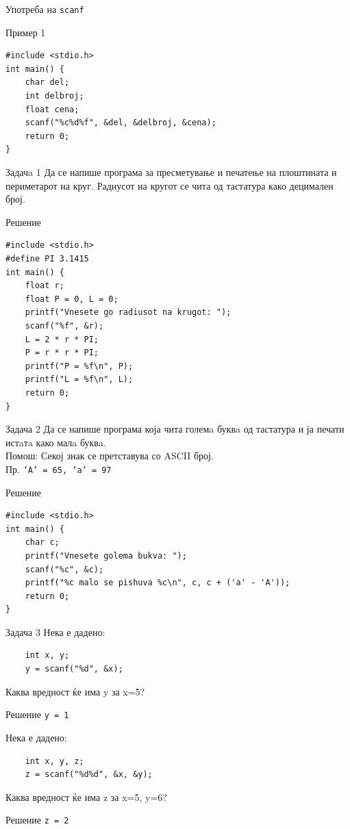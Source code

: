 \begin{frame}[fragile]{Употреба на \texttt{scanf}}

\begin{exampleblock}{Пример 1}
\begin{lstlisting}
#include <stdio.h>
int main() {
    char del;
    int delbroj;
    float cena;
    scanf("%c%d%f", &del, &delbroj, &cena);
    return 0;
}
\end{lstlisting}
\end{exampleblock}
\end{frame}

\begin{frame}[fragile]{Задачa 1}
Да се напише програма за пресметување и печатење на плоштината и периметарот на круг. 
Радиусот на кругот се чита од тастатура како децимален број.
\pause
\begin{exampleblock}{Решение}
\begin{lstlisting}
#include <stdio.h>
#define PI 3.1415
int main() {
    float r;
    float P = 0, L = 0;
    printf("Vnesete go radiusot na krugot: ");
    scanf("%f", &r);
    L = 2 * r * PI;
    P = r * r * PI;
    printf("P = %f\n", P);
    printf("L = %f\n", L);
    return 0;
}
\end{lstlisting}
\end{exampleblock}
\end{frame}

\begin{frame}[fragile]{Задача 2}
Да се напише програма која чита големa буквa од тастатура и ја печати истaтa како малa буквa.\\
Помош: Секој знак се претставува со ASCII број.\\
Пр. \texttt{'А' = 65, 'а' = 97}
\pause
\begin{exampleblock}{Решение}
\begin{lstlisting}
#include <stdio.h>
int main() {
    char c;
    printf("Vnesete golema bukva: ");
    scanf("%c", &c);
    printf("%c malo se pishuva %c\n", c, c + ('a' - 'A'));
    return 0;
}
\end{lstlisting}
\end{exampleblock}
\end{frame}

\begin{frame}[fragile]{Задача 3}
Нека е дадено:
\begin{lstlisting}
    int x, y;
    y = scanf("%d", &x);
\end{lstlisting}
Каква вредност ќе има y за x=5?
\pause
    \begin{exampleblock}{Решение}
    \texttt{y = 1}
    \end{exampleblock}
\pause
Нека е дадено:
\begin{lstlisting}
    int x, y, z;
    z = scanf("%d%d", &x, &y);
\end{lstlisting}
    Каква вредност ќе има z за x=5, y=6?
\pause
    \begin{exampleblock}{Решение}
    \texttt{z = 2}
    \end{exampleblock}
\end{frame}

